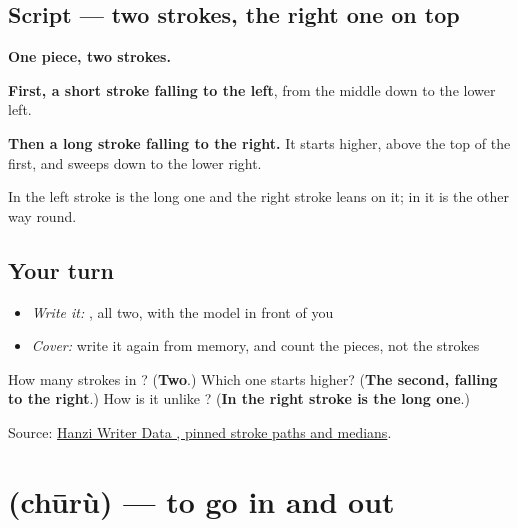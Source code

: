 \subsection*{Script — two strokes, the right one on top}

\begin{quote}
\end{quote}

\textbf{One piece, two strokes.}

\textbf{First, a short stroke falling to the left}, from the middle down to the lower left.

\textbf{Then a long stroke falling to the right.} It starts higher, above the top of the first, and sweeps down to the lower right.

In  the left stroke is the long one and the right stroke leans on it; in  it is the other way round.

\subsection*{Your turn}
\begin{itemize}
\raggedright
  \item \emph{Write it:} , all two, with the model in front of you
  \item \emph{Cover:} write it again from memory, and count the pieces, not the strokes
\end{itemize}

\begin{tcolorbox}[breakable,colback=teal!4,colframe=teal!35!black,title={Before you move on}]
How many strokes in ? (\textbf{Two}.) Which one starts higher? (\textbf{The second, falling to the right}.) How is it unlike ? (\textbf{In  the right stroke is the long one}.)

Source: \href{https://raw.githubusercontent.com/chanind/hanzi-writer-data/68d10a4b21150cae5e1ebbd223eed289cf32d90c/data/\%E5\%85\%A5.json}{Hanzi Writer Data , pinned stroke paths and medians}.
\end{tcolorbox}
\section[\texorpdfstring{\zh{出入} (chūrù)}{出入 (chūrù)}]{ (chūrù) — to go in and out}

\label{lesson:ZH-C405-churu}



